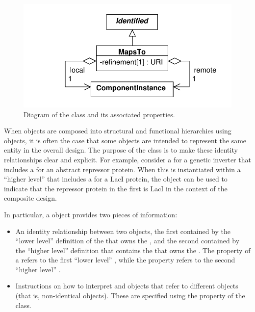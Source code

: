 \begin{figure}[ht]
\begin{center}
\includegraphics[scale=0.6]{uml/maps_to}
\caption[]{Diagram of the  class and its associated properties.}
\label{uml:maps_to}
\end{center}
\end{figure}

When  objects are composed into structural and functional hierarchies using  objects, it is often the case that some  objects are intended to represent the same entity in the overall design. The purpose of the  class is to make these identity relationships clear and explicit.  For example, consider a  for a genetic inverter that includes a  for an abstract repressor protein.  When this  is instantiated within a ``higher level''  that includes a  for a LacI protein, the  object can be used to indicate that the repressor protein in the first  is LacI in the context of the composite design.

In particular, a  object provides two pieces of information:
\begin{itemize}
\item An identity relationship between two  objects, the first contained by the ``lower level'' definition of the  that owns the
  , and the second contained by the ``higher level'' definition that contains the  that owns the . The  property of a  refers to the first ``lower level'' , while the  property refers to the second ``higher level'' .
\item Instructions on how to interpret  and   objects that refer to different  objects (that is, non-identical objects). These are specified using the  property of the  class.
\end{itemize}

